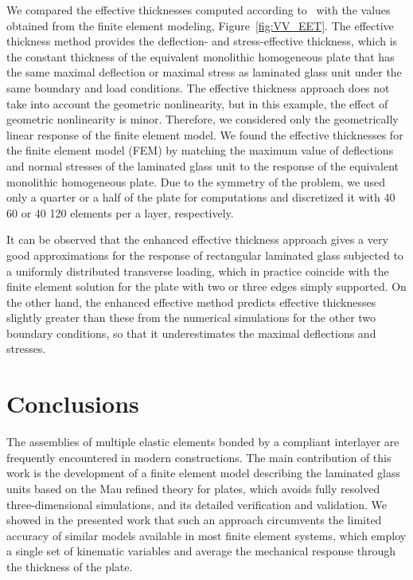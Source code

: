 \documentclass[11pt]{article}
\begin{document}
We compared the effective thicknesses computed according to~\cite{Galuppi:2012:PEFD} with the values obtained from the finite element modeling, Figure~\ref{fig:VV_EET}. The effective thickness method provides the deflection- and stress-effective thickness, which is the constant thickness of the equivalent monolithic homogeneous plate that has the same maximal deflection or maximal stress as laminated glass unit under the same boundary and load conditions. The effective thickness approach does not take into account the geometric nonlinearity, but in this example, the effect of geometric nonlinearity is minor. Therefore, we considered only the geometrically linear response of the finite element model. We found the effective thicknesses for the finite element model (FEM) by matching the maximum value of deflections and normal stresses of the laminated glass unit to the response of the equivalent monolithic homogeneous plate.
Due to the symmetry of the problem, we used only a quarter or a half of the plate for computations and discretized it with 40  60 or 40  120 elements per a layer, respectively. 

It can be observed that the enhanced effective thickness approach gives a very good approximations for the response of rectangular laminated glass subjected to a uniformly distributed transverse loading, which in practice coincide with the finite element solution for the plate with two or three edges simply supported. On the other hand, the enhanced effective method predicts effective thicknesses slightly greater than these from the numerical simulations for the other two boundary conditions, so that it underestimates the maximal deflections and stresses. 

\section{Conclusions}\label{sec:conclusions}


The assemblies of multiple elastic elements bonded by a compliant interlayer are frequently encountered in modern constructions.
The main contribution of this work is the development of a finite element model describing the laminated glass units based on the Mau refined theory for plates, which avoids fully resolved three-dimensional simulations, and its detailed verification and validation. We showed in the presented work that such an approach circumvents the limited accuracy of similar models available in most finite element systems, which employ a single set of kinematic variables and average the mechanical response through the thickness of the plate. 
\end{document}
